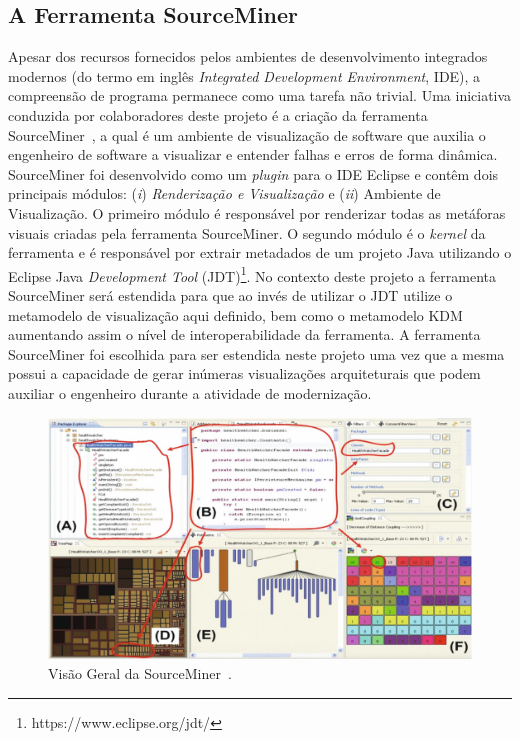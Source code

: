 \documentclass[12pt]{article}
\begin{document}
\subsection{A Ferramenta SourceMiner}\label{sec:source_miner}

Apesar dos recursos fornecidos pelos ambientes de desenvolvimento integrados modernos (do termo em inglês \textit{Integrated Development Environment}, IDE), a compreensão de programa permanece como uma tarefa não trivial. Uma iniciativa conduzida por colaboradores deste projeto é a criação da ferramenta SourceMiner~\cite{source_miner_glauco}, a qual é um ambiente de visualização de software que auxilia o engenheiro de software a visualizar e entender falhas e erros de forma dinâmica. SourceMiner foi desenvolvido como um \textit{plugin} para o IDE Eclipse e contêm dois principais módulos: (\textit{i}) \textit{Renderização e Visualização} e (\textit{ii}) Ambiente de Visualização. O primeiro módulo é responsável por renderizar todas as metáforas visuais criadas pela ferramenta SourceMiner. O segundo módulo é o \textit{kernel} da ferramenta e é responsável por extrair metadados de um projeto Java utilizando o Eclipse Java \textit{Development Tool} (JDT)\footnote{https://www.eclipse.org/jdt/}. No contexto deste projeto a ferramenta SourceMiner será estendida para que ao invés de utilizar o JDT utilize o metamodelo de visualização aqui definido, bem como o metamodelo KDM aumentando assim o nível de interoperabilidade da ferramenta. A ferramenta SourceMiner foi escolhida para ser estendida neste projeto uma vez que a mesma possui a capacidade de gerar inúmeras visualizações arquiteturais que podem auxiliar o engenheiro durante a atividade de modernização.  

\begin{figure}[h]
 \centering
 \includegraphics[scale=0.4]{sourceminerScreen.png}
 \caption{Visão Geral da SourceMiner~\cite{source_miner_glauco}.}
 \label{fig:source_miner_tool}
\end{figure}
\end{document}
